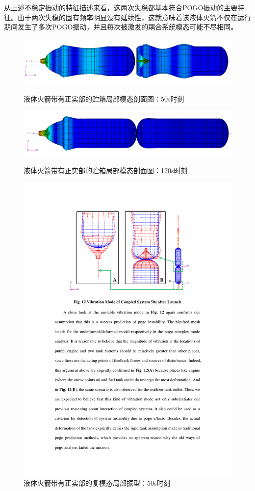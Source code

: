 从上述不稳定振动的特征描述来看，这两次失稳都基本符合POGO振动的主要特征。由于两次失稳的固有频率明显没有延续性，这就意味着该液体火箭不仅在运行期间发生了多次POGO振动，并且每次被激发的耦合系统模态可能不尽相同。

\setcounter{footnote}{0}

\begin{figure}[p]
  \centering
  \includegraphics[width=\linewidth]{50s-Modal-Deformed.png}
  \caption{液体火箭带有正实部的贮箱局部模态剖面图：50s时刻}\label{50s-Modal-Deformed}
  \vspace{1.5em}
  \includegraphics[width=\linewidth]{120s-Modal-Deformed.png}
  \caption{液体火箭带有正实部的贮箱局部模态剖面图：120s时刻}\label{120s-Modal-Deformed}
  \vspace{1.5em}
  \includegraphics[width=\linewidth]{Deformed-Modal.pdf}
  \caption{液体火箭带有正实部的复模态局部振型：50s时刻}\label{Deformed-Modal}
\end{figure}


